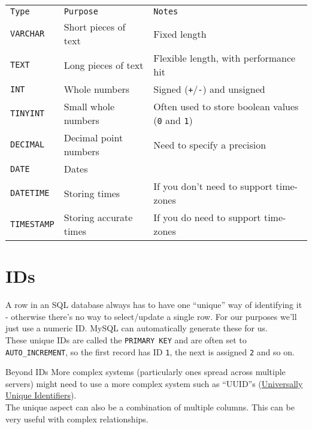 \begin{small}
    \begin{tabu}{l l X}
        \texttt{Type}       & \texttt{Purpose}       & \texttt{Notes} \\
        \texttt{VARCHAR}    & Short pieces of text   & Fixed length  \\
        \texttt{TEXT}       & Long pieces of text    & Flexible length, with performance hit  \\
        \texttt{INT}        & Whole numbers          & Signed (\texttt{+}/\texttt{-}) and unsigned  \\
        \texttt{TINYINT}    & Small whole numbers    & Often used to store boolean values (\texttt{0} and \texttt{1})  \\
        \texttt{DECIMAL}    & Decimal point numbers  & Need to specify a precision \\
        \texttt{DATE}       & Dates                  &  \\
        \texttt{DATETIME}   & Storing times          & If you don't need to support time-zones \\
        \texttt{TIMESTAMP}  & Storing accurate times & If you do need to support time-zones \\
    \end{tabu}
\end{small}
\par\bigskip


\section{IDs}

A row in an SQL database always has to have one ``unique'' way of identifying it - otherwise there's no way to select/update a single row. For our purposes we'll just use a numeric ID. MySQL can automatically generate these for us.
\\

These unique IDs are called the \texttt{PRIMARY KEY} and are often set to \texttt{AUTO\_INCREMENT}, so the first record has ID \texttt{1}, the next is assigned \texttt{2} and so on.
\\

\begin{infobox}{Beyond IDs}
    More complex systems (particularly ones spread across multiple servers) might need to use a more complex system such as ``UUID''s (\href{https://en.wikipedia.org/wiki/Universally\_unique\_identifier}{Universally Unique Identifiers}).
    \\

    The unique aspect can also be a combination of multiple columns. This can be very useful with complex relationships.
\end{infobox}

